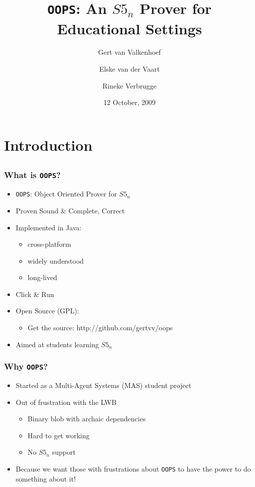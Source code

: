 \documentclass{beamer}
\title{{\tt OOPS}: An $S5_n$ Prover for Educational Settings}
\author{Gert van Valkenhoef \and Elske van der Vaart \and Rineke Verbrugge}
\date{12 October, 2009}
\begin{document}
\begin{frame}
\maketitle
\end{frame}

\section{Introduction}
\subsection{}

\begin{frame}
\frametitle{What is {\tt OOPS}?}
\begin{itemize}
\item {\tt OOPS}: Object Oriented Prover for $S5_n$
\item Proven Sound \& Complete, Correct
\item Implemented in Java:
	\begin{itemize}
	\item cross-platform
	\item widely understood
	\item long-lived
	\end{itemize}
\item Click \& Run
\item Open Source (GPL):
	\begin{itemize}
	\item Get the source: http://github.com/gertvv/oops
	\end{itemize}
\item Aimed at students learning $S5_n$
\end{itemize}
\end{frame}

\begin{frame}
\frametitle{Why {\tt OOPS}?}
\begin{itemize}
\item Started as a Multi-Agent Systems (MAS) student project
\item Out of frustration with the LWB
	\begin{itemize}
	\item Binary blob with archaic dependencies
	\item Hard to get working
	\item No $S5_n$ support
	\end{itemize}
\item Because we want those with frustrations about {\tt OOPS} to have the power to do something about it!
\end{itemize}
\end{frame}
\end{document}
